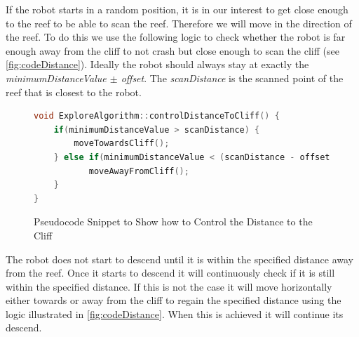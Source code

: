 \documentclass[twoside, 12pt]{article}
\begin{document}
If the robot starts in a random position, it is in our interest to get close enough to the reef to be able to scan the reef. Therefore we will move in the direction of the reef. To do this we use the following logic to check whether the robot is far enough away from the cliff to not crash but close enough to scan the cliff (see \autoref{fig:codeDistance}). Ideally the robot should always stay at exactly the \textit{minimumDistanceValue $\pm$ offset}. The \textit{scanDistance} is the scanned point of the reef that is closest to the robot.\\

\begin{figure}
\vspace{12pt}
\begin{lstlisting}[language=C++]
void ExploreAlgorithm::controlDistanceToCliff() {
    if(minimumDistanceValue > scanDistance) {
        moveTowardsCliff(); 
    } else if(minimumDistanceValue < (scanDistance - offset)) {
    	   moveAwayFromCliff();
    } 
}
\end{lstlisting} 
\vspace{-38pt}
  \caption{Pseudocode Snippet to Show how to Control the Distance to the Cliff}
  \label{fig:codeDistance}
  \vspace{20pt}
\end{figure}

\begin{figure}
\vspace{-50pt}
\end{figure}

The robot does not start to descend until it is within the specified distance away from the reef. Once it starts to descend it will continuously check if it is still within the specified distance. If this is not the case it will move horizontally either towards or away from the cliff to regain the specified distance using the logic illustrated in \autoref{fig:codeDistance}. When this is achieved it will continue its descend.\\
\end{document}
